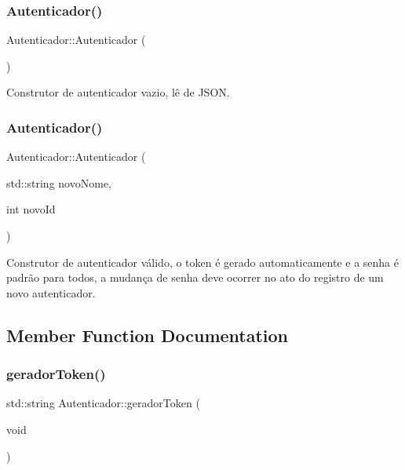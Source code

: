 \subsubsection{Autenticador()\hspace{0.1cm}{\footnotesize\ttfamily [1/2]}}
{\footnotesize\ttfamily Autenticador\+::\+Autenticador (\begin{DoxyParamCaption}{ }\end{DoxyParamCaption})\hspace{0.3cm}{\ttfamily [inline]}}

Construtor de autenticador vazio, lê de J\+S\+ON. \mbox{\label{class_autenticador_a4891aba543013dd7ef8ec2fbf9a20111}} 
\subsubsection{Autenticador()\hspace{0.1cm}{\footnotesize\ttfamily [2/2]}}
{\footnotesize\ttfamily Autenticador\+::\+Autenticador (\begin{DoxyParamCaption}\item[{std\+::string}]{novo\+Nome,  }\item[{int}]{novo\+Id }\end{DoxyParamCaption})\hspace{0.3cm}{\ttfamily [inline]}}

Construtor de autenticador válido, o token é gerado automaticamente e a senha é padrão para todos, a mudança de senha deve ocorrer no ato do registro de um novo autenticador. 

\subsection{Member Function Documentation}
\mbox{\label{class_autenticador_a5a02663a4c6b5cdb9330c5f36b9dbafe}} 
\subsubsection{gerador\+Token()}
{\footnotesize\ttfamily std\+::string Autenticador\+::gerador\+Token (\begin{DoxyParamCaption}\item[{void}]{ }\end{DoxyParamCaption})\hspace{0.3cm}{\ttfamily [inline]}}


